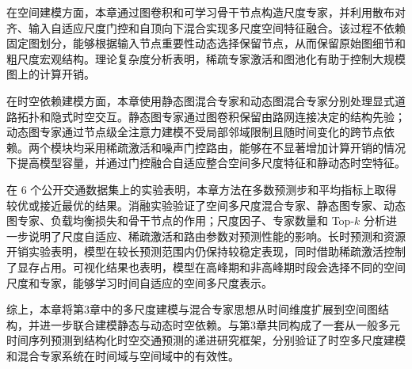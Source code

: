 在空间建模方面，本章通过图卷积和可学习骨干节点构造尺度专家，并利用散布对齐、输入自适应尺度门控和自顶向下混合实现多尺度空间特征融合。该过程不依赖固定图划分，能够根据输入节点重要性动态选择保留节点，从而保留原始图细节和粗尺度宏观结构。理论复杂度分析表明，稀疏专家激活和图池化有助于控制大规模图上的计算开销。

在时空依赖建模方面，本章使用静态图混合专家和动态图混合专家分别处理显式道路拓扑和隐式时空交互。静态图专家通过图卷积保留由路网连接决定的结构先验；动态图专家通过节点级全注意力建模不受局部邻域限制且随时间变化的跨节点依赖。两个模块均采用稀疏激活和噪声门控路由，能够在不显著增加计算开销的情况下提高模型容量，并通过门控融合自适应整合空间多尺度特征和静动态时空特征。

在 6 个公开交通数据集上的实验表明，本章方法在多数预测步和平均指标上取得较优或接近最优的结果。消融实验验证了空间多尺度混合专家、静态图专家、动态图专家、负载均衡损失和骨干节点的作用；尺度因子、专家数量和 Top-$k$ 分析进一步说明了尺度自适应、稀疏激活和路由参数对预测性能的影响。长时预测和资源开销实验表明，模型在较长预测范围内仍保持较稳定表现，同时借助稀疏激活控制了显存占用。可视化结果也表明，模型在高峰期和非高峰期时段会选择不同的空间尺度和专家，能够学习时间自适应的空间多尺度表示。

综上，本章将第3章中的多尺度建模与混合专家思想从时间维度扩展到空间图结构，并进一步联合建模静态与动态时空依赖。与第3章共同构成了一套从一般多元时间序列预测到结构化时空交通预测的递进研究框架，分别验证了时空多尺度建模和混合专家系统在时间域与空间域中的有效性。
